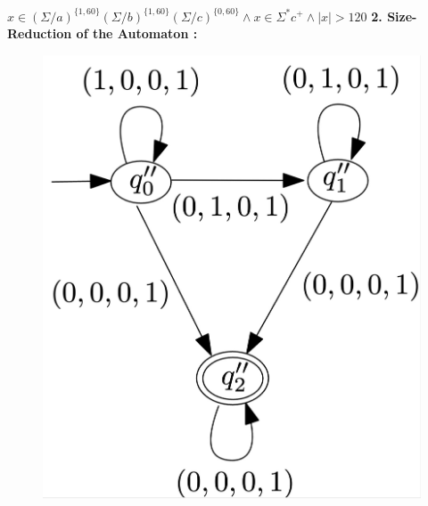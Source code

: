 \documentclass[landscape]{beamer}
\begin{document}
\begin{frame}{$ x\in (\Sigma / a)^{\{1,60\}}(\Sigma / b)^{\{1,60\}}(\Sigma / c)^{\{0,60\}} \wedge x\in \Sigma^*c^+ \wedge |x| > 120$}
  \textbf{2. Size-Reduction of the Automaton : }
  \begin{figure}
    \includegraphics[width=.45\linewidth]{overview_product_vector_simplify.jpg}
  \end{figure}
\end{frame}
\end{document}
